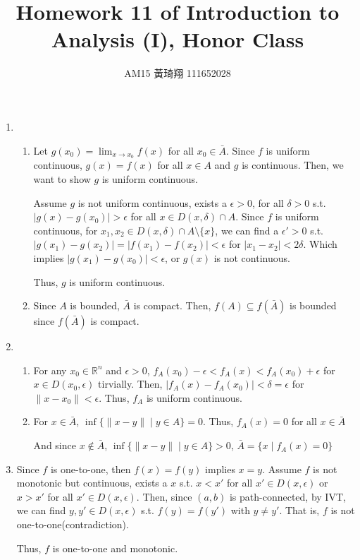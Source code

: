 \documentclass[12pt]{article}
\title{Homework 11 of Introduction to Analysis (I), Honor Class}
\author{AM15 黃琦翔 111652028}
\begin{document}
\maketitle
\begin{enumerate}
    \item \begin{enumerate}
        \item Let $g(x_0) = \displaystyle\lim_{x\to x_0} f(x)$ for all $x_0 \in \bar{A}$.
        Since $f$ is uniform continuous, $g(x) = f(x)$ for all $x\in A$ and $g$ is continuous.
        Then, we want to show $g$ is uniform continuous.

        Assume $g$ is not uniform continuous, exists a $\epsilon > 0$, for all $\delta > 0$ 
        s.t. $|g(x) - g(x_0)| > \epsilon$ for all $x \in D(x, \delta)\cap A$. 
        Since $f$ is uniform continuous, for $x_1, x_2 \in D(x, \delta)\cap A\setminus \lbrace x \rbrace$, we can find a $\epsilon' > 0$ s.t. $|g(x_1) - g(x_2)| = |f(x_1) - f(x_2)| < \epsilon$ for $|x_1 - x_2| < 2\delta$.
        Which implies $|g(x_1) - g(x_0)| < \epsilon$, or $g(x)$ is not continuous.

        Thus, $g$ is uniform continuous.

        \item Since $A$ is bounded, $\bar{A}$ is compact.
        Then, $f(A) \subseteq f(\bar{A})$ is bounded since $f(\bar{A})$ is compact.
    \end{enumerate}

    \item \begin{enumerate}
        \item For any $x_0\in \mathbb{R}^n$ and $\epsilon > 0$, $f_A(x_0) - \epsilon < f_A(x) < f_A(x_0) + \epsilon$ for $x\in D(x_0, \epsilon)$ tirvially.
        Then, $|f_A(x) - f_A(x_0)| < \delta = \epsilon$ for $\| x - x_0 \| < \epsilon$.
        Thus, $f_A$ is uniform continuous.

        \item For $x\in \bar{A}$, $\inf\{ \| x-y\| \mid y\in A\} = 0$.
        Thus, $f_A(x) = 0$ for all $x\in \bar{A}$

        And since $x\notin \bar{A}$, $\inf\{ \| x-y\| \mid y\in A\} > 0$, $\bar{A} = \{ x\mid f_A(x) = 0\}$
    \end{enumerate}
    
    \item Since $f$ is one-to-one, then $f(x) = f(y)$ implies $x = y$.
    Assume $f$ is not monotonic but continuous, exists a $x$ s.t. $x < x'$ for all $x' \in D(x, \epsilon)$ 
    or $x > x'$ for all $x' \in D(x, \epsilon)$.
    Then, since $(a, b)$ is path-connected, by IVT, we can find $y, y'\in D(x, \epsilon)$ s.t. $f(y) = f(y')$ with $y \neq y'$.
    That is, $f$ is not one-to-one(contradiction).

    Thus, $f$ is one-to-one and monotonic.
\end{enumerate}
\end{document}
